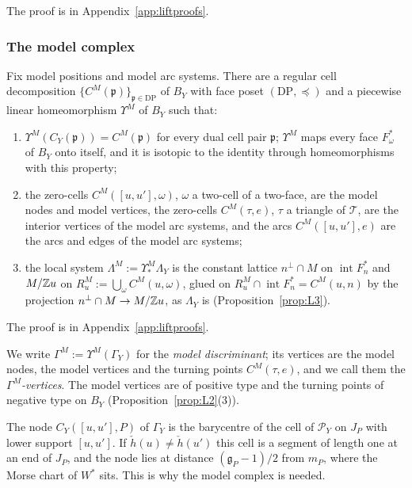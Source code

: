The proof is in Appendix~\ref{app:liftproofs}.

\subsubsection*{The model complex}

\begin{lemma}\label{lem:modelcx}
Fix model positions and model arc systems. There are a regular cell decomposition $\{C^M({\mathfrak p})\}_{{\mathfrak p}\in\mathrm{DP}}$ of $B_Y$
with face poset $(\mathrm{DP},\preceq)$ and a piecewise linear homeomorphism $\Upsilon^M$ of $B_Y$ such that:
\begin{enumerate}
\item $\Upsilon^M(C_Y({\mathfrak p}))=C^M({\mathfrak p})$ for every dual cell pair ${\mathfrak p}$; $\Upsilon^M$ maps every face $F^*_\omega$ of $B_Y$ onto
itself, and it is isotopic to the identity through homeomorphisms with this property;
\item the zero-cells $C^M([u,u'],\omega)$, $\omega$ a two-cell of a two-face, are the model nodes and model vertices, the
zero-cells $C^M(\tau,e)$, $\tau$ a triangle of $\mathcal T$, are the interior vertices of the model arc systems, and the
arcs $C^M([u,u'],e)$ are the arcs and edges of the model arc systems;
\item the local system $\Lambda^M:=\Upsilon^M_*\Lambda_Y$ is the constant lattice $n^\perp\cap M$ on $\operatorname{int}F^*_n$
and $M/\mathbb Z u$ on $R^M_u:=\bigcup_\omega C^M(u,\omega)$, glued on $R^M_u\cap\operatorname{int}F^*_n=C^M(u,n)$ by the
projection $n^\perp\cap M\to M/\mathbb Z u$, as $\Lambda_Y$ is (Proposition~\ref{prop:L3}).
\end{enumerate}
\end{lemma}

The proof is in Appendix~\ref{app:liftproofs}.

We write $\Gamma^M:=\Upsilon^M(\Gamma_Y)$ for the \emph{model discriminant}; its vertices are the model nodes, the model
vertices and the turning points $C^M(\tau,e)$, and we call them the \emph{$\Gamma^M$-vertices}. The model vertices are of
positive type and the turning points of negative type on $B_Y$ (Proposition~\ref{prop:L2}(3)).

\begin{remark}\label{rem:literalpos}
The node $C_Y([u,u'],P)$ of $\Gamma_Y$ is the barycentre of the cell of $\mathscr P_Y$ on $J_P$ with lower support
$[u,u']$. If $\check h(u)\ne\check h(u')$ this cell is a segment of length one at an end of $J_P$, and the node lies at
distance $(\mathfrak g_P-1)/2$ from $m_P$, where the Morse chart of $W^*$ sits. This is why the model complex is
needed.
\end{remark}


